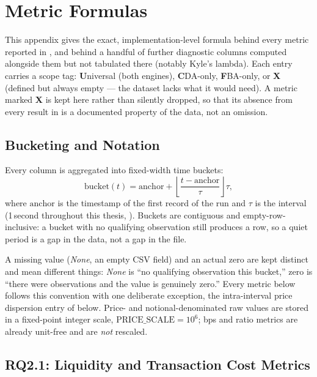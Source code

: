 \chapter{Metric Formulas}
\label{app:formulas}

This appendix gives the exact, implementation-level formula behind every
metric reported in , and behind a handful of further
diagnostic columns computed alongside them but not tabulated there (notably
Kyle's lambda). Each entry carries a scope tag: \textbf{U}niversal (both
engines), \textbf{C}DA-only, \textbf{F}BA-only, or \textbf{X} (defined but
always empty --- the dataset lacks what it would need). A metric marked
\textbf{X} is kept here rather than silently dropped, so that its absence
from every result in  is a documented property of the
data, not an omission.

\section{Bucketing and Notation}

Every column is aggregated into fixed-width time buckets:
\begin{equation}
  \mathrm{bucket}(t) = \mathrm{anchor} + \left\lfloor \frac{t -
  \mathrm{anchor}}{\tau} \right\rfloor \tau,
\end{equation}
where $\mathrm{anchor}$ is the timestamp of the first record of the run
and $\tau$ is the interval (1\,second throughout this thesis,
). Buckets are contiguous and empty-row-inclusive: a
bucket with no qualifying observation still produces a row, so a quiet
period is a gap in the data, not a gap in the file.

A missing value (\emph{None}, an empty CSV field) and an actual zero are
kept distinct and mean different things: \emph{None} is ``no qualifying
observation this bucket,'' zero is ``there were observations and the
value is genuinely zero.'' Every metric below follows this convention
with one deliberate exception, the intra-interval price dispersion
entry of  below. Price- and notional-denominated raw
values are stored in a fixed-point integer scale,
$\mathrm{PRICE\_SCALE} = 10^{6}$; bps and ratio metrics are already
unit-free and are \emph{not} rescaled.

\section{RQ2.1: Liquidity and Transaction Cost Metrics}

